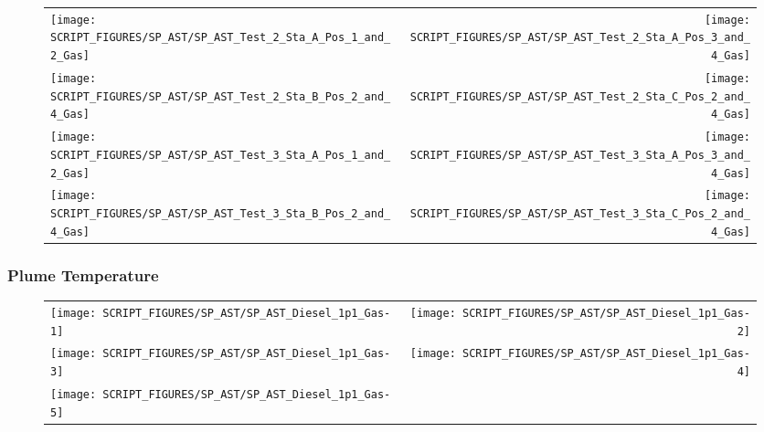 \newpage

\begin{figure}[!ht]
\begin{tabular*}{\textwidth}{l@{\extracolsep{\fill}}r}
\texttt{[image: SCRIPT\_FIGURES/SP\_AST/SP\_AST\_Test\_2\_Sta\_A\_Pos\_1\_and\_2\_Gas]} &
\texttt{[image: SCRIPT\_FIGURES/SP\_AST/SP\_AST\_Test\_2\_Sta\_A\_Pos\_3\_and\_4\_Gas]} \\
\texttt{[image: SCRIPT\_FIGURES/SP\_AST/SP\_AST\_Test\_2\_Sta\_B\_Pos\_2\_and\_4\_Gas]} &
\texttt{[image: SCRIPT\_FIGURES/SP\_AST/SP\_AST\_Test\_2\_Sta\_C\_Pos\_2\_and\_4\_Gas]} \\
\texttt{[image: SCRIPT\_FIGURES/SP\_AST/SP\_AST\_Test\_3\_Sta\_A\_Pos\_1\_and\_2\_Gas]} &
\texttt{[image: SCRIPT\_FIGURES/SP\_AST/SP\_AST\_Test\_3\_Sta\_A\_Pos\_3\_and\_4\_Gas]} \\
\texttt{[image: SCRIPT\_FIGURES/SP\_AST/SP\_AST\_Test\_3\_Sta\_B\_Pos\_2\_and\_4\_Gas]} &
\texttt{[image: SCRIPT\_FIGURES/SP\_AST/SP\_AST\_Test\_3\_Sta\_C\_Pos\_2\_and\_4\_Gas]}
\end{tabular*}
\label{SP_Test_2_3_Gas}
\end{figure}

\clearpage

\subsubsection{Plume Temperature}

\begin{figure}[!ht]
\begin{tabular*}{\textwidth}{l@{\extracolsep{\fill}}r}
\texttt{[image: SCRIPT\_FIGURES/SP\_AST/SP\_AST\_Diesel\_1p1\_Gas-1]}   &  \texttt{[image: SCRIPT\_FIGURES/SP\_AST/SP\_AST\_Diesel\_1p1\_Gas-2]}    \\
\texttt{[image: SCRIPT\_FIGURES/SP\_AST/SP\_AST\_Diesel\_1p1\_Gas-3]}   &  \texttt{[image: SCRIPT\_FIGURES/SP\_AST/SP\_AST\_Diesel\_1p1\_Gas-4]}     \\
\texttt{[image: SCRIPT\_FIGURES/SP\_AST/SP\_AST\_Diesel\_1p1\_Gas-5]}   &
\end{tabular*}
\label{SP_Diesel_1p1_Gas}
\end{figure}

\newpage

